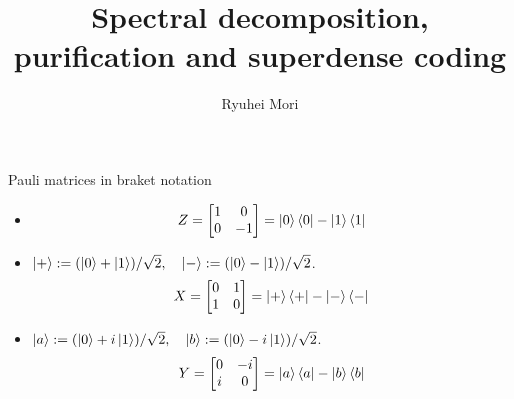 \documentclass[10pt]{beamer}
\title{Spectral decomposition, purification and superdense coding}
\author{Ryuhei Mori}
\institute{Tokyo Institute of Technology}
\date{}
\begin{document}
\begin{frame}[plain]
\maketitle
\end{frame}

\begin{frame}{Pauli matrices in braket notation}
\begin{itemize}
\setlength{\itemsep}{3em}
\item
\begin{equation*}
Z=\begin{bmatrix}1&0\\0&-1\end{bmatrix}=
\ket{0}\bra{0}
-\ket{1}\bra{1}
\end{equation*}
\item
$\ket{+}:=(\ket{0}+\ket{1})/\sqrt{2},\quad  \ket{-}:=(\ket{0}-\ket{1})/\sqrt{2}$.
\begin{equation*}
X=\begin{bmatrix}0&1\\1&0\end{bmatrix}=
\ket{+}\bra{+}
-\ket{-}\bra{-}
\end{equation*}
\item
$\ket{a}:=(\ket{0}+i\ket{1})/\sqrt{2},\quad  \ket{b}:=(\ket{0}-i\ket{1})/\sqrt{2}$.
\begin{equation*}
Y=\begin{bmatrix}0&-i\\i&0\end{bmatrix}=
\ket{a}\bra{a}
-\ket{b}\bra{b}
\end{equation*}
\end{itemize}
\end{frame}
\end{document}
